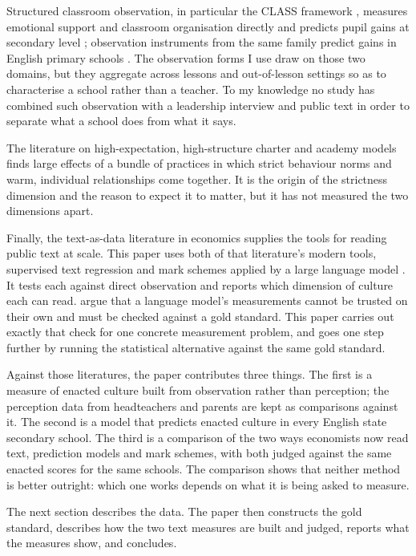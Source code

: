 Structured classroom observation, in particular the CLASS framework \citep{pianta2012}, measures emotional support and classroom organisation directly and predicts pupil gains at secondary level \citep{allen2013}; observation instruments from the same family predict gains in English primary schools \citep{sammons2008}. The
observation forms I use draw on those two domains, but they aggregate across
lessons and out-of-lesson settings so as to characterise a school rather
than a teacher. To my knowledge no study has combined such observation with
a leadership interview and public text in order to separate what a school
does from what it says.

The literature on high-expectation, high-structure
charter and academy models
\citep{abdulkadiroglu2011,angrist2010,dobbie2013,fryer2014} finds large
effects of a bundle of practices in which strict behaviour norms and warm,
individual relationships come together. It is the origin of the strictness
dimension and the reason to expect it to matter, but it has not measured the two dimensions apart.

Finally, the text-as-data literature in economics
\citep{gentzkow2019} supplies the tools for reading public text at
scale.  This paper uses both of that literature's modern tools, supervised text regression and mark schemes applied
by a large language model \citep{gilardi2023,eloundou2024}. It tests each against direct observation
and reports which dimension of culture each can read. \citet{ludwig2025} argue that a language model's measurements cannot be trusted on their own and must be checked against a gold standard. This paper carries out exactly that check for one concrete measurement problem, and goes one step further by running the statistical alternative against the same gold standard.

Against those literatures, the paper contributes three things. The first is a measure of enacted culture built from observation rather than perception; the perception data from headteachers and parents are kept as comparisons against it. The second is a model that predicts enacted culture in every English state secondary school. The third is a comparison of the two ways economists now read text, prediction models and mark schemes, with both judged against the same enacted scores for the same schools. The comparison shows that neither method is better outright: which one works depends on what it is being asked to measure.

The next section describes the data. The paper then constructs the gold standard, describes how the two text measures are built and judged, reports what the measures show, and concludes.


